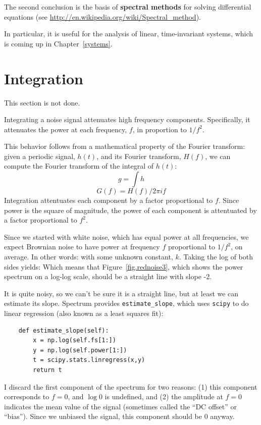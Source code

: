 \documentclass[12pt]{book}
\begin{document}
The second conclusion is the basis of {\bf spectral methods} for
solving differential equations (see
\url{http://en.wikipedia.org/wiki/Spectral_method}).

In particular, it is useful for the analysis of linear, time-invariant
systems, which is coming up in Chapter~\ref{systems}.


\section{Integration}

This section is not done.

Integrating a noise signal attenuates high frequency components.
Specifically, it attenuates the power at each frequency, $f$, in
proportion to $1/f^2$.

This behavior follows from a mathematical property of
the Fourier transform: given a periodic signal, $h(t)$, and its
Fourier transform, $H(f)$, we can compute the Fourier transform
of the integral of $h(t)$:
%
\[ g = \int h \]
%
\[ G(f) = H(f) / 2 \pi i f \]
%
Integration attentuates each component by a factor proportional
to $f$.  Since power is the square of magnitude, the power of each
component is attentuated by a factor proportional to $f^2$.

Since we started with white noise, which has equal power at all
frequencies, we expect Brownian noise to have power at frequency $f$
proportional to $1/f^2$, on average.  In other words:
with some unknown constant, $k$.  Taking the log of both sides yields:
Which means that Figure~\ref{fig.rednoise3}, which shows the power
spectrum on a log-log scale, should be
a straight line with slope -2.

It is quite noisy, so we can't be sure it is a straight line, but at
least we can estimate its slope.  Spectrum provides
\verb"estimate_slope", which uses {\tt scipy} to do linear regression
(also known as a least squares fit):

\begin{verbatim}
    def estimate_slope(self):
        x = np.log(self.fs[1:])
        y = np.log(self.power[1:])
        t = scipy.stats.linregress(x,y)
        return t
\end{verbatim}

I discard the first component of the spectrum for two reasons: (1)
this component corresponds to $f=0$, and $\log 0$ is undefined,
and (2) the amplitude at $f=0$ indicates the mean value of the signal
(sometimes called the ``DC offset'' or ``bias'').  Since we unbiased
the signal, this component should be 0 anyway.
\end{document}
